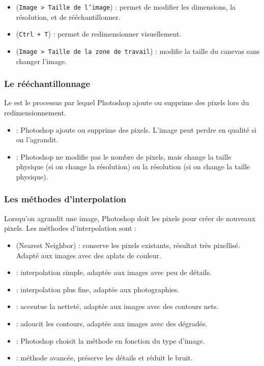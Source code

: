 \begin{itemize}
    \item {} (\texttt{Image > Taille de l'image}) : permet de modifier les dimensions, la résolution, et de rééchantillonner.
    \item {} (\texttt{Ctrl + T}) : permet de redimensionner visuellement.
    \item {} (\texttt{Image > Taille de la zone de travail}) : modifie la taille du canevas sans changer l'image.
\end{itemize}

\subsubsection{Le rééchantillonnage}

Le  est le processus par lequel Photoshop ajoute ou supprime des pixels lors du redimensionnement.

\begin{itemize}
    \item {} : Photoshop ajoute ou supprime des pixels. L'image peut perdre en qualité si on l'agrandit.
    \item {} : Photoshop ne modifie pas le nombre de pixels, mais change la taille physique (si on change la résolution) ou la résolution (si on change la taille physique).
\end{itemize}

\subsubsection{Les méthodes d'interpolation}

Lorsqu'on agrandit une image, Photoshop doit  les pixels pour créer de nouveaux pixels. Les méthodes d'interpolation sont :

\begin{itemize}
    \item {} (Nearest Neighbor) : conserve les pixels existants, résultat très pixellisé. Adapté aux images avec des aplats de couleur.
    \item {} : interpolation simple, adaptée aux images avec peu de détails.
    \item {} : interpolation plus fine, adaptée aux photographies.
    \item {} : accentue la netteté, adaptée aux images avec des contours nets.
    \item {} : adoucit les contours, adaptée aux images avec des dégradés.
    \item {} : Photoshop choisit la méthode en fonction du type d'image.
    \item {} : méthode avancée, préserve les détails et réduit le bruit.
\end{itemize}

